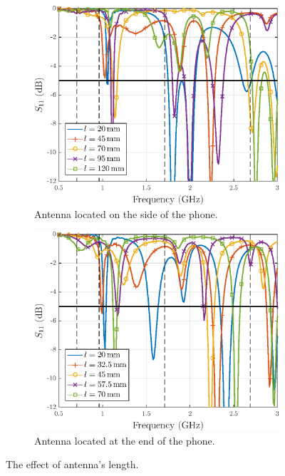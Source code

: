\begin{figure}[H]
    \centering
    \begin{subfigure}[b]{0.49\textwidth}
        \includegraphics[width=\textwidth]{img/ant_length_long_res.eps}
        \caption{Antenna located on the side of the phone.}
        \label{fig:ant_length_long_res}
    \end{subfigure}
    \begin{subfigure}[b]{0.49\textwidth}
        \includegraphics[width=\textwidth]{img/ant_length_short_res.eps}
        \caption{Antenna located at the end of the phone.}
        \label{fig:ant_length_short_res}
    \end{subfigure}
    \caption{The effect of antenna's length.}
    \label{fig:ant_length_result}
\end{figure}

